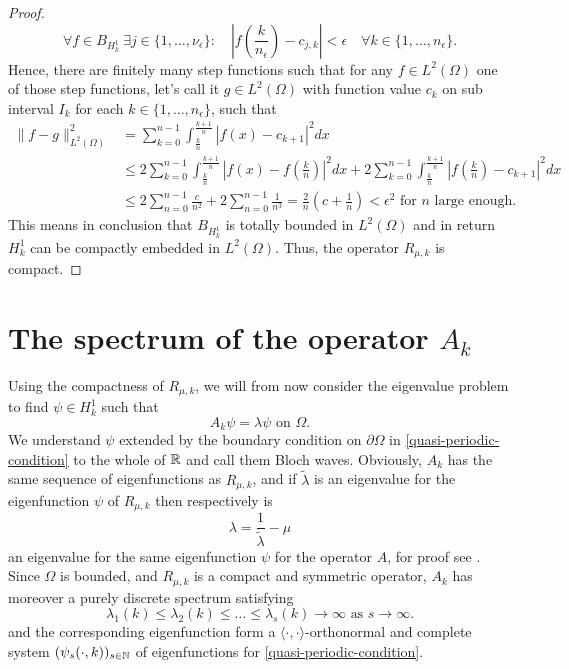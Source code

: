 \begin{theorem}
\begin{proof}
			$$ \forall f \in B_{H^{1}_{k}} ~\exists j \in \{1, \dotsc, \nu_{\epsilon} \}: \quad \left|f\left(\frac{k}{n_{\epsilon}}\right) - c_{j, k}\right| < \epsilon \quad \forall k \in \{ 1 , \dotsc, n_{\epsilon} \}. $$	
	Hence, there are finitely many step functions such that for any $f \in L^{2}(\Omega)$ one of those step functions, let's call it $g \in L^{2}(\Omega)$ with function value $c_{k}$ on sub interval $I_{k}$ for each $k \in \{ 1, \dotsc, n_{\epsilon} \}$, such that
		\begin{align*}
			\| f - g \|^{2}_{L^{2}(\Omega)} & = \sum_{k = 0}^{n-1} \int_{\frac{k}{n}}^{\frac{k+1}{n}} | f(x) - c_{k+1} |^{2} dx \\
				& \leq  2 \sum_{k = 0}^{n-1} \int_{\frac{k}{n}}^{\frac{k+1}{n}} | f(x) - f(\frac{k}{n}) |^{2} dx +  2 \sum_{k = 0}^{n-1} \int_{\frac{k}{n}}^{\frac{k+1}{n}} | f(\frac{k}{n}) - c_{k+1} |^{2} dx \\
				& \leq 2 \sum_{n = 0}^{n-1} \frac{c}{n^{2}} + 2 \sum_{n=0}^{n-1} \frac{1}{n^{3}} = \frac{2}{n} \left( c + \frac{1}{n} \right) < \epsilon^{2} \text{ for } n \text{ large enough.}
		\end{align*}		 
	This means in conclusion that $B_{H^{1}_{k}}$ is totally bounded in $L^{2}(\Omega)$ and in return $H^{1}_{k}$ can be compactly embedded in $L^{2}(\Omega)$. Thus, the operator $R_{\mu, k}$ is compact.
	\end{proof}	
\end{theorem}		

\section{The spectrum of the operator $A_{k}$}	
Using the compactness of $R_{\mu, k}$, we will from now consider the eigenvalue problem to find $\psi \in H^{1}_{k}$ such that
	\begin{equation}
		A_{k} \psi = \lambda \psi \text{ on } \Omega. \label{eigv-problem}
	\end{equation}
We understand $\psi$ extended by the boundary condition on $\partial \Omega$ in \eqref{quasi-periodic-condition} to the whole of $\mathbb{R}$ and call them Bloch waves. Obviously, $A_{k}$ has the same sequence of eigenfunctions as $R_{\mu, k}$, and if $\tilde{\lambda}$ is an eigenvalue for the eigenfunction $\psi$ of $R_{\mu, k}$ then respectively is %
	\[ \lambda = \frac{1}{\tilde{\lambda}} - \mu \]
 an eigenvalue for the same eigenfunction $\psi$ for the operator $A$, for proof see \cite{WeisFA}. Since $\Omega$ is bounded, and $R_{\mu, k}$ is a compact and symmetric operator, $A_{k}$ has moreover a purely discrete spectrum satisfying	
	\[ \lambda_{1}(k) \leq \lambda_{2}(k) \leq \dotsc \leq \lambda_{s}(k) \rightarrow \infty \text{ as } s \rightarrow \infty. \]
and the corresponding eigenfunction form a $\langle \cdot , \cdot \rangle$-orthonormal and complete system $(\psi_{s}(\cdot, k))_{s \in \mathbb{N}}$ of eigenfunctions for \eqref{quasi-periodic-condition}. ~\\

